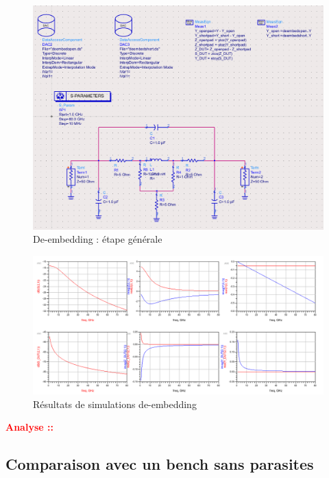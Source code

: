 \documentclass[a4paper]{article}
\begin{document}
\begin{figure}[!htb]
\begin{center}
  \includegraphics[scale=0.40]{de_embedding_whole.png}
  \caption{De-embedding : \'etape g\'en\'erale}
  \label{de-embedding-whole}
\end{center}
\end{figure}

\begin{figure}[!htb]
\begin{center}
  \includegraphics[scale=0.40]{de-embedding_whole_sim.png}
  \caption{R\'esultats de simulations de-embedding}
  \label{de-embedding-whole-sim}
\end{center}
\end{figure}

\textbf{\textcolor{red}{Analyse :: }}

\clearpage
\subsection{Comparaison avec un bench sans parasites}
\end{document}
